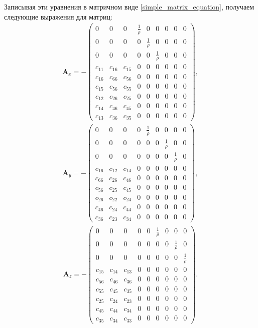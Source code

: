 Записывая эти уравнения в матричном виде \eqref{simple_matrix_equation}, получаем следующие выражения для матриц:	
\begin{align}
\label{anisotropic_mat1}	
\mathbf{A}_x = - 
\left( \begin{array}{cccccccccccc}
0 & 0 & 0 & \frac 1 \rho & 0 & 0 & 0 & 0 & 0 \\ 
0 & 0 & 0 & 0 & \frac 1 \rho & 0 & 0 & 0 & 0 \\ 
0 & 0 & 0 & 0 & 0 & \frac 1 \rho & 0 & 0 & 0 \\ 
c_{11} & c_{16} & c_{15} & 0 & 0 & 0 & 0 & 0 & 0 \\ 
c_{16} & c_{66} & c_{56} & 0 & 0 & 0 & 0 & 0 & 0 \\
c_{15} & c_{56} & c_{55} & 0 & 0 & 0 & 0 & 0 & 0 \\ 
c_{12} & c_{26} & c_{25} & 0 & 0 & 0 & 0 & 0 & 0 \\ 
c_{14} & c_{46} & c_{45} & 0 & 0 & 0 & 0 & 0 & 0 \\ 
c_{13} & c_{36} & c_{35} & 0 & 0 & 0 & 0 & 0 & 0
\end{array} \right),
\end{align} 
\begin{align}
\label{anisotropic_mat2}
\mathbf{A}_y = - 
\left( \begin{array}{cccccccccccc}
0 & 0 & 0 & 0 & \frac 1 \rho & 0 & 0 & 0 & 0 \\ 
0 & 0 & 0 & 0 & 0 & 0 & \frac 1 \rho & 0 & 0 \\ 
0 & 0 & 0 & 0 & 0 & 0 & 0 & \frac 1 \rho & 0 \\ 
c_{16} & c_{12} & c_{14} & 0 & 0 & 0 & 0 & 0 & 0 \\ 
c_{66} & c_{26} & c_{46} & 0 & 0 & 0 & 0 & 0 & 0 \\
c_{56} & c_{25} & c_{45} & 0 & 0 & 0 & 0 & 0 & 0 \\
c_{26} & c_{22} & c_{24} & 0 & 0 & 0 & 0 & 0 & 0 \\ 
c_{46} & c_{24} & c_{44} & 0 & 0 & 0 & 0 & 0 & 0 \\
c_{36} & c_{23} & c_{34} & 0 & 0 & 0 & 0 & 0 & 0   
\end{array} \right),
\end{align}
\begin{align}
\label{anisotropic_mat3}
\mathbf{A}_z = - 
\left( \begin{array}{cccccccccccc}
0 & 0 & 0 & 0 & 0 & \frac 1 \rho & 0 & 0 & 0 \\ 
0 & 0 & 0 & 0 & 0 & 0 & 0 & \frac 1 \rho & 0 \\ 
0 & 0 & 0 & 0 & 0 & 0 & 0 & 0 & \frac 1 \rho \\ 
c_{15} & c_{14} & c_{13} & 0 & 0 & 0 & 0 & 0 & 0 \\ 
c_{56} & c_{46} & c_{36} & 0 & 0 & 0 & 0 & 0 & 0 \\
c_{55} & c_{45} & c_{35} & 0 & 0 & 0 & 0 & 0 & 0 \\ 
c_{25} & c_{24} & c_{23} & 0 & 0 & 0 & 0 & 0 & 0 \\ 
c_{45} & c_{44} & c_{34} & 0 & 0 & 0 & 0 & 0 & 0 \\ 
c_{35} & c_{34} & c_{33} & 0 & 0 & 0 & 0 & 0 & 0  
\end{array} \right).
\end{align}\\


